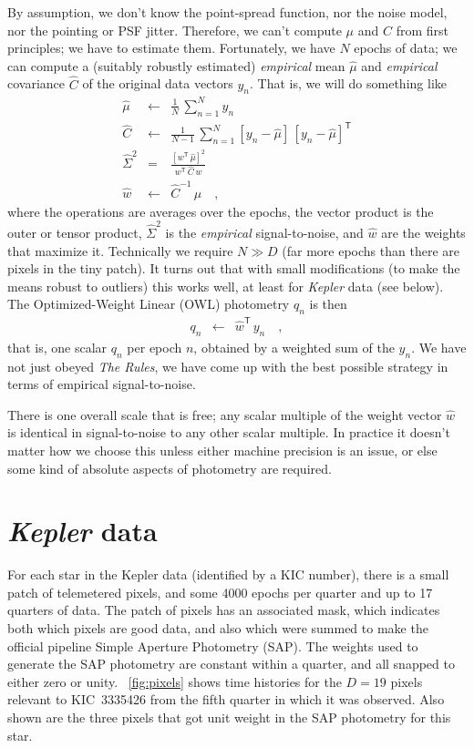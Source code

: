 \documentclass[12pt, letterpaper, preprint]{aastex}
\newcommand{\project}[1]{\textsl{#1}}
\newcommand{\transpose}[1]{{#1}^{\!\mathsf T}}
\newcommand{\inverse}[1]{{#1}^{-1}}
\begin{document}
By assumption, we don't know the point-spread function,
  nor the noise model,
  nor the pointing or PSF jitter.
Therefore, we can't compute $\mu$ and $C$ from first principles; we have to estimate them.
Fortunately, we have $N$ epochs of data;
  we can compute a (suitably robustly estimated)
  \emph{empirical} mean $\hat{\mu}$ and \emph{empirical} covariance $\hat{C}$
  of the original data vectors $y_n$.
That is, we will do something like
\begin{eqnarray}
  \hat{\mu} &\leftarrow& \frac{1}{N}\,\sum_{n=1}^N y_n
  \\
  \hat{C} &\leftarrow& \frac{1}{N-1}\,\sum_{n=1}^N [y_n - \hat{\mu}]\,\transpose{[y_n - \hat{\mu}]}
  \\
  \hat{\Sigma}^2 &=& \frac{[\transpose{w}\, \hat{\mu}]^2}{\transpose{w}\, \hat{C}\, w}
  \\
  \hat{w} &\leftarrow& \inverse{\hat{C}}\, \hat{\mu}
  \quad ,
\end{eqnarray}
  where the operations are averages over the epochs,
  the vector product is the outer or tensor product,
  $\hat{\Sigma}^2$ is the \emph{empirical} signal-to-noise,
  and $\hat{w}$ are the weights that maximize it.
Technically we require $N \gg D$
  (far more epochs than there are pixels in the tiny patch).
It turns out that with small modifications
  (to make the means robust to outliers)
  this works well, at least for \project{Kepler} data (see below).
The Optimized-Weight Linear (OWL) photometry $q_n$ is then
\begin{eqnarray}
  q_n &\leftarrow& \transpose{\hat{w}}\, y_n
  \quad ,
\end{eqnarray}
  that is, one scalar $q_n$ per epoch $n$, obtained by a weighted sum of the $y_n$.
We have not just obeyed \emph{The Rules},
  we have come up with the best possible strategy in terms of empirical signal-to-noise.

There is one overall scale that is free;
  any scalar multiple of the weight vector $\hat{w}$ is identical in signal-to-noise
  to any other scalar multiple.
In practice it doesn't matter how we choose this unless either machine precision is an issue,
  or else some kind of absolute aspects of photometry are required.

\section{\project{Kepler} data}

For each star in the Kepler data (identified by a KIC number),
  there is a small patch of telemetered pixels,
  and some 4000 epochs per quarter and up to 17 quarters of data.
The patch of pixels has an associated mask,
  which indicates both which pixels are good data,
  and also which were summed to make the official pipeline
  Simple Aperture Photometry (SAP).
The weights used to generate the SAP photometry are constant within a quarter,
  and all snapped to either zero or unity.
\figurename~\ref{fig:pixels} shows time histories for the $D=19$ pixels relevant
  to KIC~3335426 from the fifth quarter in which it was observed.
Also shown are the three pixels that got unit weight in the SAP photometry for this star.
\end{document}
